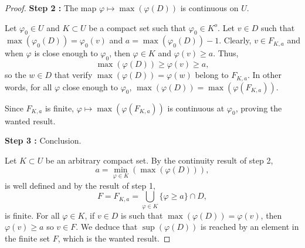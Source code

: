 \documentclass[10pt,a4paper]{amsart}
\newcommand{\inter}[1]{#1^o}
\renewcommand{\geq}{\geqslant}
\begin{document}
\begin{proof}
\vspace{1mm}
\noindent\textbf{Step 2 :} The map $\varphi \mapsto \max(\varphi(D))$ is continuous on $U$.
\vspace{1mm}

Let $\varphi_0 \in U$ and $K \subset U$ be a compact set such that $\varphi_0 \in \inter{K}$. Let $v \in D$ such that $\max(\varphi_0(D)) = \varphi_0(v)$ and $a = \max(\varphi_0(D)) - 1$. Clearly, $v \in F_{K,a}$ and when $\varphi$ is close enough to $\varphi_0$, then $\varphi \in K$ and $\varphi(v) \geq a$. Thus,
$$
\max(\varphi(D)) \geq \varphi(v) \geq a,
$$
so the $w \in D$ that verify $\max(\varphi(D)) = \varphi(w)$ belong to $F_{K,a}$. In other words, for all $\varphi$ close enough to $\varphi_0$, $\max(\varphi(D)) = \max(\varphi(F_{K,a}))$.

Since $F_{K,a}$ is finite, $\varphi \mapsto \max(\varphi(F_{K,a}))$ is continuous at $\varphi_0$, proving the wanted result.

\vspace{1mm}
\noindent\textbf{Step 3 :} Conclusion.
\vspace{1mm}

Let $K \subset U$ be an arbitrary compact set. By the continuity result of step 2,
$$
a = \min_{\varphi \in K}(\max(\varphi(D))),
$$
is well defined and by the result of step 1,
$$
F = F_{K,a} = \bigcup_{\varphi \in K} \{\varphi \geq a\} \cap D,
$$
is finite. For all $\varphi \in K$, if $v \in D$ is such that $\max(\varphi(D)) = \varphi(v)$, then $\varphi(v) \geq a$ so $v \in F$. We deduce that $\sup(\varphi(D))$ is reached by an element in the finite set $F$, which is the wanted result.
\end{proof}
\end{document}
